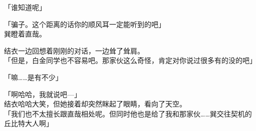 「谁知道呢」

「骗子。这个距离的话你的顺风耳一定能听到的吧」\\

巽瞪着直哉。

结衣一边回想着刚刚的对话，一边耸了耸肩。\\

「但是，白金同学也不容易吧。那家伙这么奇怪，肯定对你说过很多有的没的吧」

「嘛……是有不少」

「啊哈哈，我就说吧—」\\

结衣哈哈大笑，但她接着却突然眯起了眼睛，看向了天空。\\

「我们也不太擅长跟直哉相处呢。但同时他也是给了我和那家伙……巽交往契机的丘比特大人啊」
